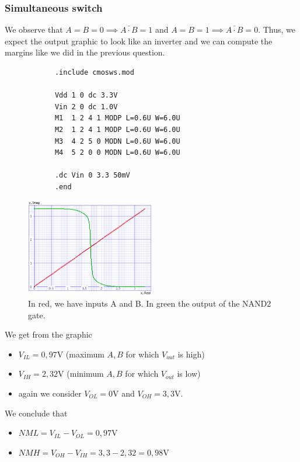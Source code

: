 \documentclass[../main.tex]{subfiles}
\begin{document}
{	\subsubsection{Simultaneous switch}
	{
		
		We observe that $A = B = 0 \implies \bar{A \cdot B} = 1$ and $A = B = 1 \implies \bar{A \cdot B} = 0$. Thus, we expect the output graphic to look like an inverter and we can compute the margins like we did in the previous question.
		
		\begin{lstlisting}
			.include cmosws.mod
			
			Vdd 1 0 dc 3.3V
			Vin 2 0 dc 1.0V
			M1  1 2 4 1 MODP L=0.6U W=6.0U
			M2  1 2 4 1 MODP L=0.6U W=6.0U
			M3  4 2 5 0 MODN L=0.6U W=6.0U
			M4  5 2 0 0 MODN L=0.6U W=6.0U
			
			.dc Vin 0 3.3 50mV
			.end
		\end{lstlisting}
		
		\begin{figure}[H]
			\centering
			\includegraphics[width=0.5\textwidth]{plots/Q5_1.png}
			\caption{In red, we have inputs A and B. In green the output of the NAND2 gate.}
		\end{figure}
		
		We get from the graphic
		
		\begin{itemize}
			\item $V_{IL} = 0,97$V (maximum $A,B$ for which $V_{out}$ is high)
			\item $V_{IH} = 2,32$V (minimum $A,B$ for which $V_{out}$ is low)
			\item again we consider $V_{OL} = 0$V and $V_{OH} = 3,3$V.
		\end{itemize}
		
		We conclude that
		\begin{itemize}
			\item $NML = V_{IL} - V_{OL} = 0,97$V
			\item $NMH = V_{OH} - V_{IH} = 3,3 - 2,32 = 0,98$V
		\end{itemize}
	}
	
}
\end{document}
